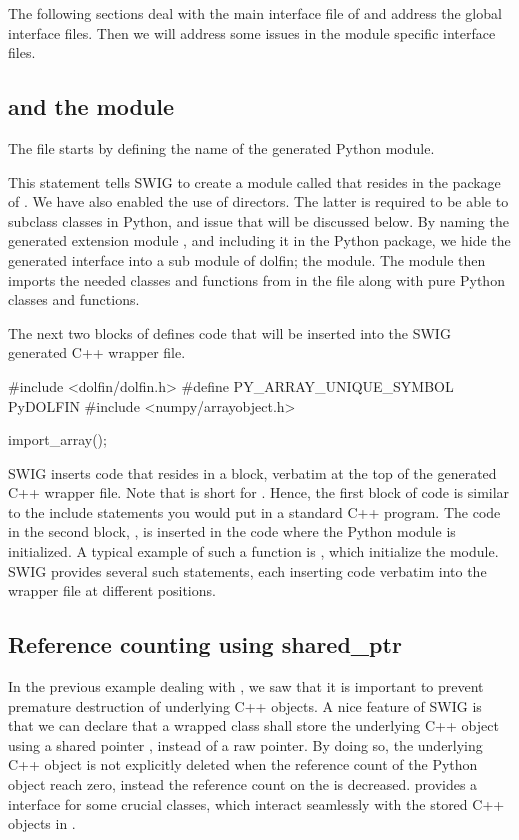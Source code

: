 The following sections deal with the main
interface file of  and address the global interface files. Then we will address some issues in the module specific interface files.

\subsection{ and the  module}
The file  starts by defining the name of the generated Python module.
\begin{c++}
\end{c++}
This statement tells SWIG to create a module called  that resides
in the package of . We have also enabled the use of directors.
The latter is required to be able to subclass \dolfin classes in Python,
and issue that will be discussed below.  By naming the generated extension module
, and including it in the  Python package, we hide the generated interface into a sub module of dolfin; the  module. 
The  module then imports the needed classes and functions 
from  in the  file along with  pure Python classes and functions. 

The next two blocks of  defines code that will be inserted into the SWIG generated C++ wrapper file.
\begin{c++}
#include <dolfin/dolfin.h>
#define PY_ARRAY_UNIQUE_SYMBOL PyDOLFIN
#include <numpy/arrayobject.h>

import_array();
\end{c++}
SWIG inserts code that resides in a \emp{\%\{$\ldots$\}\%} block, verbatim
at the top of the generated C++ wrapper file. Note that
\emp{\%\{$\ldots$\}\%} is short for . Hence,
the first block of code is similar to the include statements you would
put in a standard C++ program. The code in the second block,
, is inserted in the code where the Python
module is initialized. A typical example of such a function is
, which initialize the \numpy module. SWIG provides
several such statements, each inserting code verbatim into the wrapper file
at different positions.


\subsection{Reference counting using shared\_ptr}
In the previous example dealing with , we saw that it is
important to prevent premature destruction of underlying C++ objects. A
nice feature of SWIG is that we can declare that a wrapped class shall
store the underlying C++ object using a shared pointer , instead of a raw
pointer. By doing so, the underlying C++ object is not explicitly deleted
when the reference count of the Python object reach zero, instead the
reference count on the  is decreased. \dolfin provides a
 interface for some crucial classes, which interact
seamlessly with the  stored C++ objects in \dolfin. 

